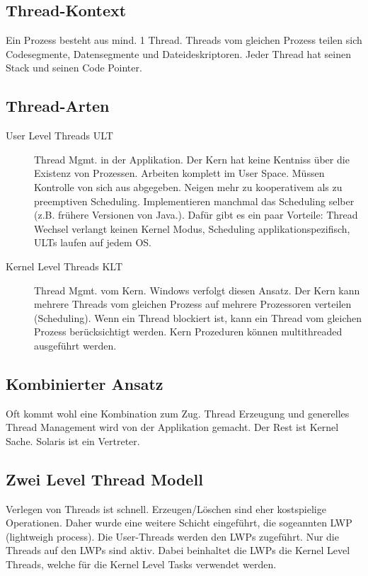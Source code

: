 \subsection{Thread-Kontext}
Ein Prozess besteht aus mind. 1 Thread. Threads vom gleichen Prozess teilen sich Codesegmente, Datensegmente und Dateideskriptoren. Jeder Thread hat seinen Stack und seinen Code Pointer.

\subsection{Thread-Arten}
\begin{description}
	\item[User Level Threads ULT]
	Thread Mgmt. in der Applikation. Der Kern hat keine Kentniss über die Existenz von Prozessen. Arbeiten komplett im User Space. Müssen Kontrolle von sich aus abgegeben. Neigen mehr zu kooperativem als zu preemptiven Scheduling. Implementieren manchmal das Scheduling selber (z.B. frühere Versionen von Java.).
	Dafür gibt es ein paar Vorteile: Thread Wechsel verlangt keinen Kernel Modus, Scheduling applikationspezifisch, ULTs laufen auf jedem OS.
	\item[Kernel Level Threads KLT]
	Thread Mgmt. vom Kern. Windows verfolgt diesen Ansatz. Der Kern kann mehrere Threads vom gleichen Prozess auf mehrere Prozessoren verteilen (Scheduling). Wenn ein Thread blockiert ist, kann ein Thread vom gleichen Prozess berücksichtigt werden. Kern Prozeduren können multithreaded ausgeführt werden.
\end{description}

\subsection{Kombinierter Ansatz}
Oft kommt wohl eine Kombination zum Zug. Thread Erzeugung und generelles Thread Management wird von der Applikation gemacht. Der Rest ist Kernel Sache. Solaris ist ein Vertreter.

\subsection{Zwei Level Thread Modell}
Verlegen von Threads ist schnell. Erzeugen/Löschen sind eher kostspielige Operationen. Daher wurde eine weitere Schicht eingeführt, die sogeannten LWP (lightweigh process). Die User-Threads werden den LWPs zugeführt. Nur die Threads auf den LWPs sind aktiv. Dabei beinhaltet die LWPs die Kernel Level Threads, welche für die Kernel Level Tasks verwendet werden.

